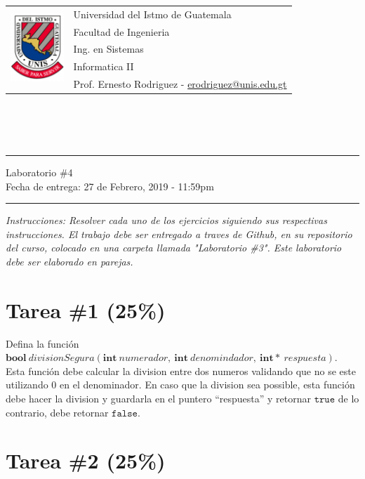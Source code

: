 \documentclass{article}
\newcommand{\horrule}[1]{\rule{\linewidth}{#1}}
\begin{document}
\begin{tabular}{l l}
\multirow{5}{*}{\includegraphics[width=2cm]{../../recursos/logo.png}} & Universidad del Istmo de Guatemala \\
 & Facultad de Ingenieria \\
 & Ing. en Sistemas \\
 & Informatica II \\
 & Prof. Ernesto Rodriguez - \href{mailto:erodriguez@unis.edu.gt}{erodriguez@unis.edu.gt} \\
\end{tabular}
\\\\\\

\begin{center}
        \horrule{0.5pt}
        \huge{Laboratorio \#4} \\
        \large{Fecha de entrega: 27 de Febrero, 2019 - 11:59pm} \\
        \horrule{1pt}
\end{center}

\emph{Instrucciones: Resolver cada uno de los ejercicios siguiendo sus respectivas
instrucciones. El trabajo debe ser entregado a traves de Github, en su repositorio del curso, colocado en una carpeta llamada "Laboratorio \#3".
Este laboratorio debe ser elaborado en parejas.}

\section*{Tarea \#1 (25\%)}

Defina la funci\'on $\mathbf{bool}\ divisionSegura(\mathbf{int}\ numerador,\ \mathbf{int}\ denomindador,\ \mathbf{int*}\ respuesta)$.
Esta funci\'on debe calcular la division entre dos numeros validando que no se este utilizando 0 en el denominador.
En caso que la division sea possible, esta funci\'on debe hacer la division y guardarla en el puntero ``respuesta'' y
retornar $\mathtt{true}$ de lo contrario, debe retornar $\mathtt{false}$.

\section*{Tarea \#2 (25\%)}
\end{document}
